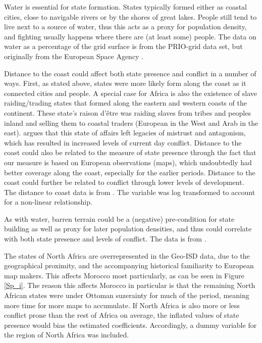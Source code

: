 \documentclass[12pt]{article}
\begin{document}
Water is essential for state formation. States typically formed either as
coastal cities, close to navigable rivers or by the shores of great lakes.
People still tend to live next to a source of water, thus this acts as a proxy
for population density, and fighting usually happens where there are (at least
some) people. The data on water as a percentage of the grid surface is from the
PRIO-grid data set, but originally from the European Space Agency
\citep{Bontemps2009}.

Distance to the coast could affect both state presence and conflict in a number
of ways. First, as stated above, states were more likely form along the
coast as it connected cities and people. A special case for Africa is also the
existence of slave raiding/trading states that formed along the eastern and
western coasts of the continent. These state's raison d'être was raiding slaves
from tribes and peoples inland and selling them to coastal traders (European in
the West and Arab in the east). \citet{Nunn2008} argues that this state of
affairs left legacies of mistrust and antagonism, which has resulted in
increased levels of current day conflict. Distance to the coast could also be
related to the measure of state presence through the fact that our measure is
based on European observations (maps), which undoubtedly had better coverage
along the coast, especially for the earlier periods. Distance to the coast could
further be related to conflict through lower levels of development. The distance
to coast data is from \citet{Wessel1996}. The variable was log transformed to
account for a non-linear relationship.

As with water, barren terrain could be a (negative) pre-condition for state
building as well as proxy for later population densities, and thus could
correlate with both state presence and levels of conflict. The data is from
\citet{Bontemps2009}.

The states of North Africa are overrepresented in the Geo-ISD data, due to the
geographical proximity, and the accompanying historical familiarity to European
map makers. This affects Morocco most particularly, as can be seen in Figure
\ref{Sp_i}. The reason this affects Morocco in particular is that the remaining
North African states were under Ottoman suzerainty for much of the period,
meaning more time for more maps to accumulate. If North Africa is also more or less
conflict prone than the rest of Africa on average, the inflated values of state
presence would bias the estimated coefficients. Accordingly, a dummy variable
for the region of North Africa was included.
\end{document}
